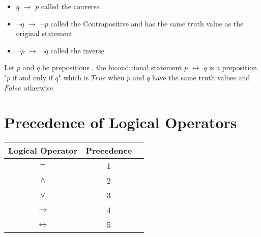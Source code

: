 \documentclass[a4paper]{article}
\begin{document}
\begin{itemize}
  \item $q$ $\rightarrow$ $p$ called the converse .
  \item $\neg q$ $\rightarrow$ $\neg p$ called the Contrapositive and has the same truth value as the original statement
  \item $\neg p$ $\rightarrow$ $\neg q$ called the inverse 
\end{itemize}
\begin{definition}
  Let $p$ and $q$ be prepositions , the biconditional statement $p$ $\leftrightarrow$ $q$ is a preposition "$p$ if and only if $q$" which is $True$ when $p$ and $q$ have the same truth values and $False$ otherwise 
\end{definition}
\section{Precedence of Logical Operators}
\begin{tabular}{|c|c|c|}
 \hline
 Logical Operator & Precedence \\
 \hline
 $\neg$ & 1\\
 \hline
 $\wedge$ & 2\\
 $\vee$ & 3\\
 \hline
 $\rightarrow$ & 4\\
 $\leftrightarrow $& 5\\
 \hline
\end{tabular}
\end{document}
